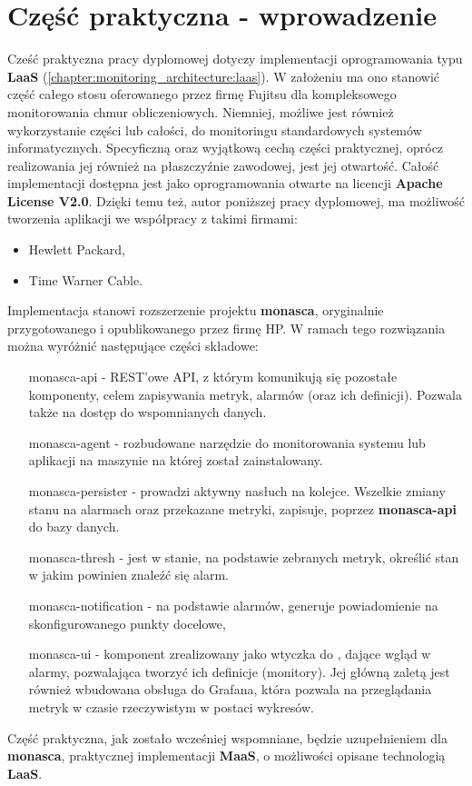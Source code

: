 \chapter{Część praktyczna - wprowadzenie}
\label{chapter:application}


Cześć praktyczna pracy dyplomowej dotyczy implementacji oprogramowania typu \textbf{LaaS} (\ref{chapter:monitoring_architecture:laas}).
W założeniu ma ono stanowić część całego stosu oferowanego przez firmę Fujitsu dla kompleksowego monitorowania chmur obliczeniowych.
Niemniej, możliwe jest również wykorzystanie części lub całości, do monitoringu standardowych systemów informatycznych. 
Specyficzną oraz wyjątkową cechą części praktycznej, oprócz realizowania jej również na płaszczyźnie zawodowej, jest jej otwartość.
Całość implementacji dostępna jest jako oprogramowania otwarte na licencji \textbf{Apache License V2.0}. 
Dzięki temu też, autor poniższej pracy dyplomowej, ma możliwość tworzenia aplikacji we współpracy z takimi firmami:
\begin{itemize}
    \item Hewlett Packard,
    \item Time Warner Cable.
\end{itemize}

Implementacja stanowi rozszerzenie projektu \textbf{monasca}, oryginalnie przygotowanego i opublikowanego przez firmę HP.
W ramach tego rozwiązania można wyróżnić następujące części składowe:
\begin{itemize}
    \item[monasca-api] - REST'owe API, z którym komunikują się pozostałe komponenty, celem zapisywania metryk, alarmów (oraz ich definicji).
    Pozwala także na dostęp do wspomnianych danych.
    \item[monasca-agent] - rozbudowane narzędzie do monitorowania systemu lub aplikacji na maszynie na której został zainstalowany.
    \item[monasca-persister] - prowadzi aktywny nasłuch na kolejce. Wszelkie zmiany stanu na alarmach oraz przekazane metryki, zapisuje,
    poprzez \textbf{monasca-api} do bazy danych.
    \item[monasca-thresh] - jest w stanie, na podstawie zebranych metryk, określić stan w jakim powinien znaleźć się alarm.
    \item[monasca-notification] - na podstawie alarmów, generuje powiadomienie na skonfigurowanego punkty docelowe,
    \item[monasca-ui] - komponent zrealizowany jako wtyczka do , dające wgląd w alarmy, pozwalająca tworzyć ich definicje (monitory).
    Jej główną zaletą jest również wbudowana obsługa do Grafana, która pozwala na przeglądania metryk w czasie rzeczywistym w postaci wykresów.
\end{itemize}
Część praktyczna, jak zostało wcześniej wspomniane, będzie uzupełnieniem dla \textbf{monasca}, praktycznej implementacji
\textbf{MaaS}, o możliwości opisane technologią \textbf{LaaS}.






